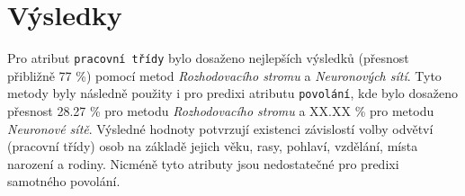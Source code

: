 \documentclass[11pt,a4paper,titlepage]{article}
\begin{document}
    \section{Výsledky}
        Pro atribut \texttt{pracovní třídy} bylo dosaženo nejlepších výsledků (přesnost přibližně 77 \%) pomocí metod \textit{Rozhodovacího stromu} a \textit{Neuronových sítí}. Tyto metody byly následně použity i pro predixi atributu \texttt{povolání}, kde bylo dosaženo přesnost 28.27 \% pro metodu \textit{Rozhodovacího stromu} a XX.XX \% pro metodu \textit{Neuronové sítě}. Výsledné hodnoty potvrzují existenci závislostí volby odvětví (pracovní třídy) osob na základě jejich věku, rasy, pohlaví, vzdělání, místa narození a rodiny. Nicméně tyto atributy jsou nedostatečné pro predixi samotného povolání.
        
    
\end{document}
